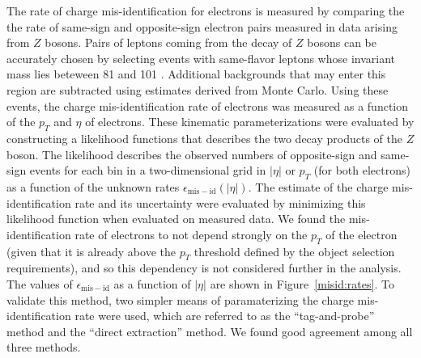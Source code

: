 The rate of charge mis-identification for electrons is measured by comparing the the rate of same-sign and opposite-sign electron pairs measured in data arising from $Z$ bosons.
Pairs of leptons coming from the decay of $Z$ bosons can be accurately chosen by selecting events with same-flavor leptons whose invariant mass lies beteween 81 \GeV{} and 101 \GeV{}.
Additional backgrounds that may enter this region are subtracted using estimates derived from Monte Carlo.
Using these events, the charge mis-identification rate of electrons was measured as a function of the $p_T$ and $\eta$ of electrons.
These kinematic parameterizations were evaluated by constructing a likelihood functions that describes the two decay products of the $Z$ boson.
The likelihood describes the observed numbers of opposite-sign and same-sign events for each bin in a two-dimensional grid in $|\eta|$ or $p_T$ (for both electrons) as a function of the unknown rates $\epsilon_{\mathrm{mis-id}}(|\eta|)$.
The estimate of the charge mis-identification rate and its uncertainty were evaluated by minimizing this likelihood function when evaluated on measured data.
We found the mis-identification rate of electrons to not depend strongly on the $p_T$ of the electron (given that it is already above the $p_T$ threshold defined by the object selection requirements), and so this dependency is not considered further in the analysis.
The values of $\epsilon_{\mathrm{mis-id}}$ as a function of $|\eta|$ are shown in Figure~\ref{misid:rates}.
To validate this method, two simpler means of paramaterizing the charge mis-identification rate were used, which are referred to as the ``tag-and-probe'' method and the ``direct extraction'' method.
We found good agreement among all three methods. 



